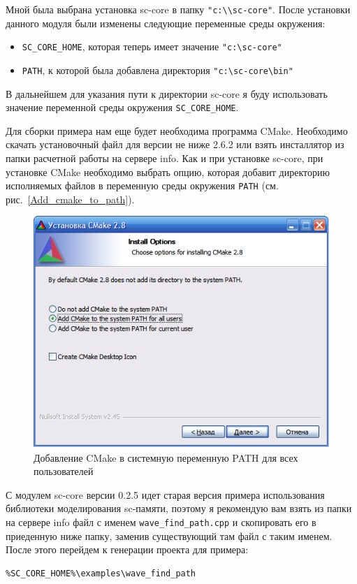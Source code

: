 Мной была выбрана установка sc-core в папку
\verb+"c:\\sc-core"+. После установки данного модуля были изменены
следующие переменные среды окружения:
\begin{itemize}
\item \verb+SC_CORE_HOME+, которая теперь имеет значение
  \verb+"c:\sc-core"+
\item \verb+PATH+, к которой была добавлена директория
  \verb+"c:\sc-core\bin"+
\end{itemize}

В дальнейшем для указания пути к директории sc-core я буду
использовать значение переменной среды окружения \verb+SC_CORE_HOME+.

Для сборки примера нам еще будет необходима программа
CMake. Необходимо скачать установочный файл для версии не ниже 2.6.2
или взять инсталлятор из папки расчетной работы на сервере info. Как и
при установке sc-core, при установке CMake необходимо выбрать опцию,
которая добавит директорию исполняемых файлов в переменную среды
окружения \verb+PATH+ (см. рис.~\ref{Add_cmake_to_path}).
 
\begin{figure}[h]
  \centering
  \includegraphics[scale=0.7]{images/4/setup/Add_cmake_to_path}
  \caption{Добавление CMake в системную переменную PATH для всех
    пользователей}
  \label{fig:Add_cmake_to_path}
\end{figure}

С модулем sc-core версии 0.2.5 идет старая версия примера
использования библиотеки моделирования sc-памяти, поэтому я рекомендую
вам взять из папки на сервере info файл с именем
\verb+wave_find_path.cpp+ и скопировать его в приеденную ниже папку,
заменив существующий там файл с таким именем. После этого перейдем к
генерации проекта для примера:
\begin{verbatim}
%SC_CORE_HOME%\examples\wave_find_path
\end{verbatim}

